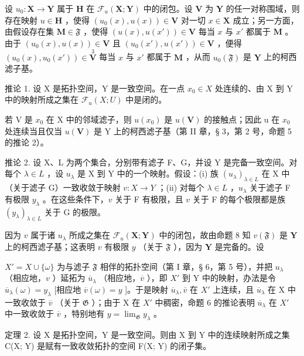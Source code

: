 设 \(u_0: \mathbf{X} \to \mathbf{Y}\) 属于 \(\mathbf{H}\) 在 \(\mathcal{F}_u(\mathbf{X}; \mathbf{Y})\) 中的闭包。设 \(\mathbf{V}\) 为 \(\mathbf{Y}\) 的任一对称围域，则存在映射 \(u \in \mathbf{H}\) ，使得 \((u_0(x), u(x)) \in \mathbf{V}\) 对一切 \(x \in \mathbf{X}\) 成立；另一方面，由假设存在集 \(\mathbf{M} \in \mathfrak{F}\) ，使得 \((u(x), u(x')) \in \mathbf{V}\) 每当 \(x\) 与 \(x'\) 都属于 \(\mathbf{M}\) 。由于 \((u_0(x), u(x)) \in \mathbf{V}\) 且 \((u_0(x'), u(x')) \in \mathbf{V}\) ，便得 \((u_0(x), u_0(x')) \in \overset{3}{\mathbf{V}}\) 每当 \(x\) 与 \(x'\) 都属于 \(\mathbf{M}\) ，从而 \(u_0(\mathfrak{F})\) 是 \(\mathbf{Y}\) 上的柯西滤子基。

推论 1. 设 X 是拓扑空间，Y 是一致空间。在一点 \(x_{0} \in X\) 处连续的、由 X 到 Y 中的映射所成之集在 \(\mathcal{F}_{u}(X; U)\) 中是闭的。

若 V 是 \(x_{0}\) 在 X 中的邻域滤子，则 \(u(x_{0})\) 是 \(u(\mathbf{V})\) 的接触点；因此 u 在 \(x_{0}\) 处连续当且仅当 \(u(\mathbf{V})\) 是 Y 上的柯西滤子基（第 II 章，§ 3，第 2 号，命题 5 的推论 2）。

推论 2. 设 X、L 为两个集合，分别带有滤子 F、G，并设 Y 是完备一致空间。对每个 \(\lambda \in L\) ，设 \(u_{\lambda}\) 是 X 到 Y 中的一个映射。假设：(i) 族 \((u_{\lambda})_{\lambda \in L}\) 在 X 中（关于滤子 G）一致收敛于映射 \(v: X \to Y\) ；(ii) 对每个 \(\lambda \in L\) ，\(u_{\lambda}\) 关于滤子 F 有极限 \(y_{\lambda}\) 。在这些条件下，\(v\) 关于 F 有极限，且 \(v\) 关于 F 的每个极限都是族 \((y_{\lambda})_{\lambda \in L}\) 关于 G 的极限。

因为 \(v\) 属于诸 \(u_{\lambda}\) 所成之集在 \(\mathcal{F}_u(\mathbf{X};\mathbf{Y})\) 中的闭包，故由命题 8 知 \(v(\mathfrak{F})\) 是 \(\mathbf{Y}\) 上的柯西滤子基；这表明 \(v\) 有极限 \(y\) （关于 \(\mathfrak{F}\) ），因为 \(\mathbf{Y}\) 是完备的。设

\(X' = X \cup \{\omega\}\) 为与滤子 \(\mathfrak{F}\) 相伴的拓扑空间（第 I 章，§ 6，第 5 号），并把 \(u_{\lambda}\) （相应地，\(v\) ）延拓为 \(\overline{u}_{\lambda}\) （相应地，\(\overline{v}\) ），即 \(X'\) 到 Y 中的映射，办法是令 \(\overline{u}_{\lambda}(\omega) = y_{\lambda}\) {[}相应地 \(\overline{v}(\omega) = y\) {]}。于是映射 \(\overline{u}_{\lambda}, \overline{v}\) 在 \(X'\) 上连续，且 \(\overline{u}_{\lambda}\) 在 X 中一致收敛于 \(\overline{v}\) （关于 \(\mathfrak{G}\) ）；由于 X 在 \(X'\) 中稠密，命题 6 的推论表明 \(\overline{u}_{\lambda}\) 在 \(X'\) 中一致收敛于 \(\overline{v}\) ，特别地有 \(y = \lim_{\mathfrak{G}} y_{\lambda}\) 。

定理 2. 设 X 是拓扑空间，Y 是一致空间。则由 X 到 Y 中的连续映射所成之集 C(X; Y) 是赋有一致收敛拓扑的空间 F(X; Y) 的闭子集。

